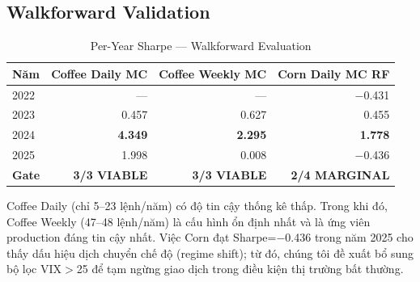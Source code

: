 \documentclass[conference]{IEEEtran}
\begin{document}
\subsection{Walkforward Validation}
\begin{table}[t]
\caption{Per-Year Sharpe --- Walkforward Evaluation}
\label{tab:walkforward}
\centering
\begin{tabular}{@{}lrrr@{}}
\toprule
\textbf{Năm} & \textbf{Coffee Daily MC} & \textbf{Coffee Weekly MC} & \textbf{Corn Daily MC RF} \\
\midrule
2022 & ---          & ---          & $-$0.431 \\
2023 & 0.457        & 0.627        & 0.455 \\
2024 & \textbf{4.349} & \textbf{2.295} & \textbf{1.778} \\
2025 & 1.998        & 0.008        & $-$0.436 \\
\midrule
\textbf{Gate} & \textbf{3/3 VIABLE} & \textbf{3/3 VIABLE} & \textbf{2/4 MARGINAL} \\
\bottomrule
\end{tabular}
\end{table}
Coffee Daily (chỉ 5--23 lệnh/năm) có độ tin cậy thống kê thấp. Trong khi đó,
Coffee Weekly (47--48 lệnh/năm) là cấu hình ổn định nhất và là ứng viên
production đáng tin cậy nhất. Việc Corn đạt Sharpe=$-$0.436 trong năm 2025 cho
thấy dấu hiệu dịch chuyển chế độ (regime shift); từ đó, chúng tôi đề xuất bổ
sung bộ lọc VIX$>$25 để tạm ngừng giao dịch trong điều kiện thị trường bất
thường.
\end{document}
